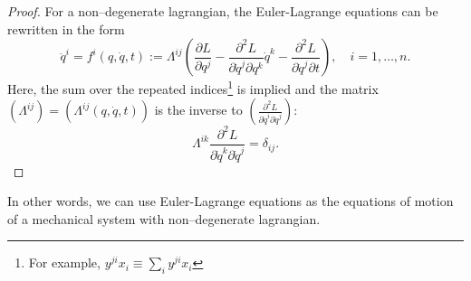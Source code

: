 \documentclass[english,fontsize=11pt,paper=a5,oneside]{scrbook}
\theoremstyle{definition}
\begin{document}
\begin{proof}
    For a non--degenerate lagrangian, the Euler-Lagrange equations can be rewritten in the form
    \begin{equation}
        \ddot q^i = f^i(q,\dot q, t)
        := \Lambda^{ij}\left(\frac{\partial L}{\partial q^j} - \frac{\partial^2 L}{\partial \dot q^j \partial q^k} \dot q^k - \frac{\partial^2 L}{\partial\dot q^j \partial t}\right),
        \quad i=1,\ldots,n.
    \end{equation}
    Here, the sum over the repeated indices\footnote{For example, $y^{ji} x_i \equiv \sum_i y^{ji} x_i$} is implied and the matrix $\left(\Lambda^{ij}\right) = \left(\Lambda^{ij}(q, \dot q, t)\right)$ is the inverse to $\left(\frac{\partial^2 L}{\partial \dot q^i \partial \dot q^j}\right)$:
    \begin{equation}
        \Lambda^{ik} \frac{\partial^2 L}{\partial \dot q^k \partial \dot q^j} = \delta_{ij}.
    \end{equation}
\end{proof}

In other words, we can use Euler-Lagrange equations as the equations of motion of a mechanical system with non--degenerate lagrangian.
\end{document}
